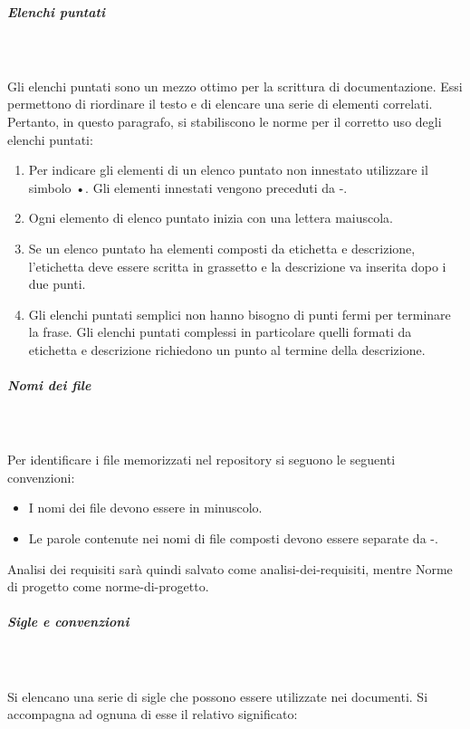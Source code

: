 \documentclass[../norme-di-progetto.tex]{subfiles}
\begin{document}
\subparagraph{Elenchi puntati}\mbox{}\\
\label{subp:elenchi puntati}
\\Gli elenchi puntati sono un mezzo ottimo per la scrittura di documentazione. Essi permettono di riordinare il testo e di elencare una serie di elementi correlati. Pertanto, in questo paragrafo, si stabiliscono le norme per il corretto uso degli elenchi puntati:
\begin{enumerate}
	\item Per indicare gli elementi di un elenco puntato non innestato utilizzare il simbolo •. Gli elementi innestati vengono preceduti da -.
	\item Ogni elemento di elenco puntato inizia con una lettera maiuscola.
	\item Se un elenco puntato ha elementi composti da etichetta e descrizione, l'etichetta deve essere scritta in grassetto e la descrizione va inserita dopo i due punti.
	\item Gli elenchi puntati semplici non hanno bisogno di punti fermi per terminare la frase. Gli elenchi puntati complessi in particolare quelli formati da etichetta e descrizione richiedono un punto al termine della descrizione.
\end{enumerate}
\subparagraph{Nomi dei file}\mbox{}\\
\label{nomi dei file}
\\Per identificare i file memorizzati nel repository si seguono le seguenti convenzioni:
\begin{itemize}
	\item I nomi dei file devono essere in minuscolo.
	\item Le parole contenute nei nomi di file composti devono essere separate da -.
\end{itemize}
Analisi dei requisiti sarà quindi salvato come analisi-dei-requisiti, mentre Norme di progetto come norme-di-progetto.
\subparagraph{Sigle e convenzioni}\mbox{}\\
\label{sigle e convenzioni}
\\Si elencano una serie di sigle che possono essere utilizzate nei documenti. Si accompagna ad ognuna di esse il relativo significato:
\end{document}
